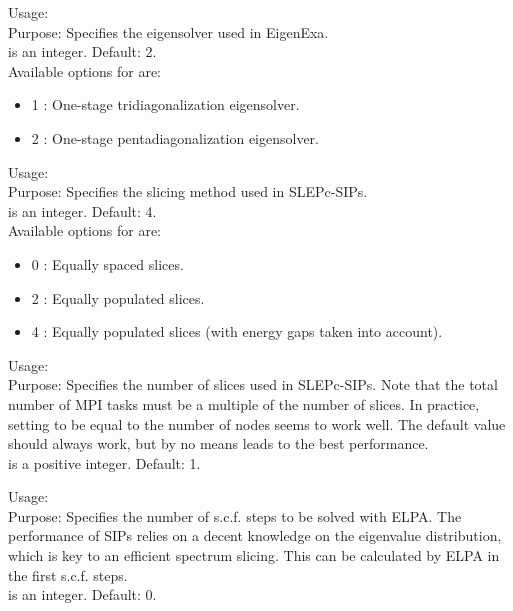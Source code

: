 {
  \noindent
  Usage:   \\[1.0ex]
  Purpose: Specifies the eigensolver used in EigenExa. \\[1.0ex]
   is an integer. Default: 2. \\
}
Available options for  are:
\begin{itemize}
  \item 1 : One-stage tridiagonalization eigensolver.
  \item 2 : One-stage pentadiagonalization eigensolver.
\end{itemize}

{
  \noindent
  Usage:   \\[1.0ex]
  Purpose: Specifies the slicing method used in SLEPc-SIPs. \\[1.0ex]
   is an integer. Default: 4. \\
}
Available options for  are:
\begin{itemize}
  \item 0 : Equally spaced slices.
  \item 2 : Equally populated slices.
  \item 4 : Equally populated slices (with energy gaps taken into account).
\end{itemize}

{
  \noindent
  Usage:   \\[1.0ex]
  Purpose: Specifies the number of slices used in SLEPc-SIPs. Note that the
    total number of MPI tasks must be a multiple of the number of slices. In
    practice, setting  to be equal to the number of nodes seems
    to work well. The default value should always work, but by no means leads to
    the best performance. \\[1.0ex]
   is a positive integer. Default: 1. \\
}

{
  \noindent
  Usage:   \\[1.0ex]
  Purpose: Specifies the number of s.c.f. steps to be solved with ELPA. The
    performance of SIPs relies on a decent knowledge on the eigenvalue
    distribution, which is key to an efficient spectrum slicing. This can be
    calculated by ELPA in the first  s.c.f. steps. \\[1.0ex]
   is an integer. Default: 0. \\
}

